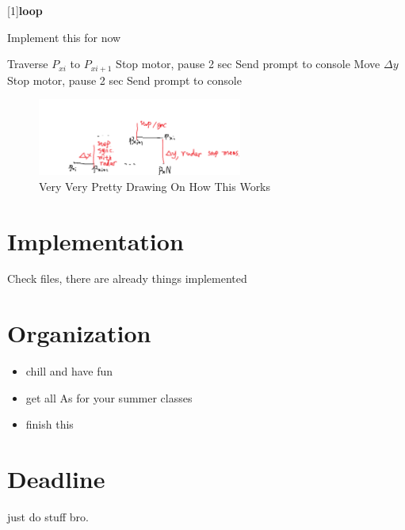 \documentclass[11pt]{article}
\begin{document}
[1]{\textbf{loop}} %
\begin{algorithm}
\caption{Implement this for now}
\begin{algorithmic}[1]
        \State Traverse $P_{xi}$ to $P_{xi+1}$
        \State Stop motor, pause 2 sec
        \State Send prompt to console
    \State Move $\Delta y$
    \State Stop motor, pause 2 sec
    \State Send prompt to console
\end{algorithmic}
\end{algorithm}

\begin{figure}[H] %
    \centering
    \includegraphics[width=0.6\textwidth, scale=3]{SARScanHow.png}
    \caption{Very Very Pretty Drawing On How This Works}
    \label{fig:art}
\end{figure}

\section{Implementation}
Check files, there are already things implemented

\section{Organization}
\begin{itemize}
    \item chill and have fun
    \item get all As for your summer classes
    \item finish this
\end{itemize}

\section{Deadline}
just do stuff bro.
\end{document}

